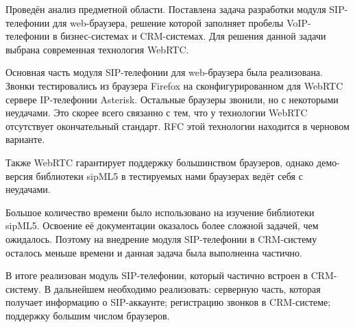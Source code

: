 \conclusion
Проведён анализ предметной области. Поставлена задача разработки модуля SIP-телефонии для web-браузера, решение которой заполняет пробелы VoIP-телефонии в бизнес-системах и CRM-системах. Для решения данной задачи выбрана современная технология WebRTC.

Основная часть модуля SIP-телефонии для web-браузера была реализована. Звонки тестировались из браузера Firefox на сконфигурированном для WebRTC сервере IP-телефонии Asterisk. Остальные браузеры звонили, но с некоторыми неудачами. Это скорее всего связанно с тем, что у технологии WebRTC отсутствует окончательный стандарт. RFC этой технологии находится в черновом варианте.

Также WebRTC гарантирует поддержку большинством браузеров, однако демо-версия библиотеки sipML5 в тестируемых нами браузерах ведёт себя с неудачами.

Большое количество времени было использовано на изучение библиотеки sipML5. Освоение её документации оказалось более сложной задачей, чем ожидалось. Поэтому на внедрение модуля SIP-телефонии в CRM-систему осталось меньше времени и данная задача была выполненна частично.

В итоге реализован модуль SIP-телефонии, который частично встроен в CRM-систему. В дальнейшем необходимо реализовать: серверную часть, которая получает информацию о SIP-аккаунте; регистрацию звонков в CRM-системе; поддержку большим числом браузеров.